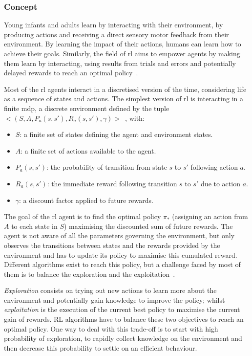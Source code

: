 \subsubsection{Concept} 
	Young infants and adults learn by interacting with their environment, by producing actions and receiving a direct sensory motor feedback from their environment. By learning the impact of their actions, humans can learn how to achieve their goals. Similarly, the field of \gls{rl} aims to empower agents by making them learn by interacting, using results from trials and errors and potentially delayed rewards to reach an optimal policy~\citep{sutton1998reinforcement}. 

	Most of the \gls{rl} agents interact in a discretised version of the time, considering life as a sequence of states and actions. The simplest version of \gls{rl} is interacting in a finite \gls{mdp}, a discrete environment defined by the tuple $<(S, A, P_a(s,s'), R_a(s,s'), \gamma)>$~\citep{howard1960dynamic}, with:
	\begin{itemize}
		\item $S$: a finite set of states defining the agent and environment states.
		\item $A$: a finite set of actions available to the agent.
		\item $P_a(s,s')$: the probability of transition from state $s$ to $s'$ following action $a$.
		\item $R_a(s,s')$: the immediate reward following transition $s$ to $s'$ due to action $a$.
		\item $\gamma$: a discount factor applied to future rewards.
	\end{itemize}
	
	The goal of the \gls{rl} agent is to find the optimal policy $\pi_*$ (assigning an action from $A$ to each state in $S$) maximising the discounted sum of future rewards. The agent is not aware of all the parameters governing the environment, but only observes the transitions between states and the rewards provided by the environment and has to update its policy to maximise this cumulated reward. Different algorithms exist to reach this policy, but a challenge faced by most of them is to balance the exploration and the exploitation~\citep{sutton1998reinforcement}.
	
	\emph{Exploration} consists on trying out new actions to learn more about the environment and potentially gain knowledge to improve the policy; whilst \emph{exploitation} is the execution of the current best policy to maximise the current gain of rewards. RL algorithms have to balance these two objectives to reach an optimal policy. One way to deal with this trade-off is to start with high probability of exploration, to rapidly collect knowledge on the environment and then decrease this probability to settle on an efficient behaviour.
	
